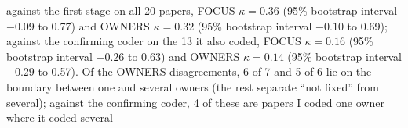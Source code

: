 against the first stage on all 20 papers, FOCUS $\kappa = 0.36$ (95\% bootstrap interval $-0.09$ to 0.77) and OWNERS $\kappa = 0.32$ (95\% bootstrap interval $-0.10$ to 0.69); against the confirming coder on the 13 it also coded, FOCUS $\kappa = 0.16$ (95\% bootstrap interval $-0.26$ to 0.63) and OWNERS $\kappa = 0.14$ (95\% bootstrap interval $-0.29$ to 0.57). Of the OWNERS disagreements, 6 of 7 and 5 of 6 lie on the boundary between one and several owners (the rest separate ``not fixed'' from several); against the confirming coder, 4 of these are papers I coded one owner where it coded several